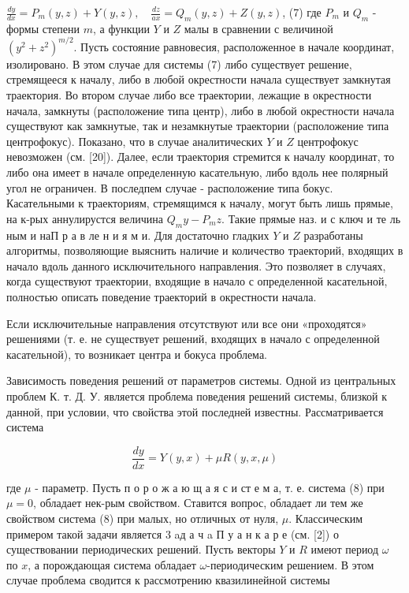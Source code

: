 \documentclass[10pt]{article}
\begin{document}
$\frac{d y}{d x}=P_{m}(y, z)+Y(y, z), \quad \frac{d z}{a x}=Q_{m}(y, z)+Z(y, z)$, (7) где $P_{m}$ и $Q_{m}$ - формы степени $m$, а функции $Y$ и $Z$ малы в сравнении с величиной $\left(y^{2}+z^{2}\right)^{m / 2}$. Пусть состояние равновесия, расположенное в начале координат, изолировано. В этом случае для системы (7) либо существует решение, стремящееся к началу, либо в любой окрестности начала существует замкнутая траектория. Во втором случае либо все траектории, лежащие в окрестности начала, замкнуты (расположение типа центр), либо в любой окрестности начала существуют как замкнутые, так и незамкнутые траектории (расположение типа центрофокус). Показано, что в случае аналитических $Y$ и $Z$ центрофокус невозможен (см. [20]). Далее, если траектория стремится к началу координат, то либо она имеет в начале определенную касательную, либо вдоль нее полярный угол не ограничен. В последпем случае - расположение типа бокус. Касательными к траекториям, стремящимся к началу, могут быть лишь прямые, на к-рых аннулирустся величина $Q_{m} y-P_{m} z$. Такие прямые наз. и с ключ и те ль ным и наП р а в ле н и я м и. Для достаточно гладких $Y$ и $Z$ разработаны алгоритмы, позволяющие выяснить наличие и количество траекторий, входящих в начало вдоль данного исключительного направления. Это позволяет в случаях, когда существуют траектории, входящие в начало с определенной касательной, полностью описать поведение траекторий в окрестности начала.



Если исключительные направления отсутствуют или все они «проходятся» решениями (т. е. не существует решений, входящих в начало с определенной касательной), то возникает центра и бокуса проблема.



Зависимость поведения решений от параметров системы. Одной из центральных проблем К. т. Д. У. является проблема поведения решений системы, близкой к данной, при условии, что свойства этой последней известны. Рассматривается система



\[

\frac{d y}{d x}=Y(y, x)+\mu R(y, x, \mu)

\]



где $\mu$ - параметр. Пусть п о р о ж а ю щ а я с и ст е м а, т. е. система (8) при $\mu=0$, обладает нек-рым свойством. Ставится вопрос, обладает ли тем же свойством система (8) при малых, но отличных от нуля, $\mu$. Классическим примером такой задачи является 3 aд а ч a П у а н к а р е (см. [2]) о существовании периодических решений. Пусть векторы $Y$ и $R$ имеют период $\omega$ по $x$, а порождающая система обладает $\omega$-периодическим решением. В этом случае проблема сводится к рассмотрению квазилинейной системы
\end{document}
